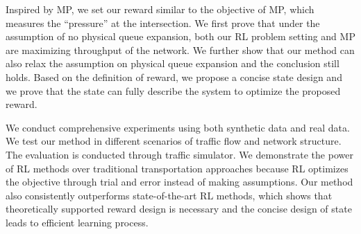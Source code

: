{Inspired by MP, we set our reward similar to the objective of MP, which measures the ``pressure'' at the intersection. We first prove that under the assumption of no physical queue expansion, both our RL problem setting and MP are maximizing throughput of the network. We further show that our method can also relax the assumption on physical queue expansion and the conclusion still holds.
Based on the definition of reward, we propose a concise state design and we prove that the state can fully describe the system to optimize the proposed reward. 

We conduct comprehensive experiments using both synthetic data and real data. We test our method in different scenarios of traffic flow and network structure. The evaluation is conducted through traffic simulator. We demonstrate the power of RL methods over traditional transportation approaches because RL optimizes the objective through trial and error instead of making assumptions. Our method also consistently outperforms state-of-the-art RL methods, which shows that theoretically supported reward design is necessary and the concise design of state leads to efficient learning process.
}